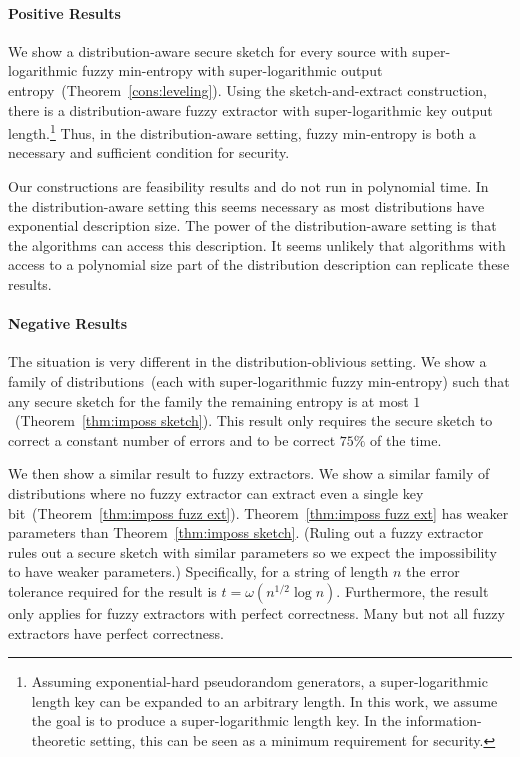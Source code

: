 \documentclass[11pt]{article}
\newcommand{\thref}[1]{\mbox{Theorem~\ref{#1}}}
\newcommand{\authnote}[2]{{\textcolor{red}{\textsf{#1 notes: }\textcolor{blue}{ #2}}\marginpar{\textcolor{red}{\textbf{!!!!!}}}}}
\newcommand{\authnote}[2]{}
\newcommand{\lnote}[1]{{\authnote{Leo}{#1}}}
\begin{document}
\paragraph{Positive Results} %
We show a distribution-aware secure sketch for every source with super-logarithmic fuzzy min-entropy with super-logarithmic output entropy~(\thref{cons:leveling}).  Using the sketch-and-extract construction, there is a distribution-aware fuzzy extractor with super-logarithmic key output length.\footnote{Assuming exponential-hard pseudorandom generators, a super-logarithmic length key can be expanded to an arbitrary length.  In this work, we assume the goal is to produce a super-logarithmic length key.  In the information-theoretic setting, this can be seen as a minimum requirement for security.}  Thus, in the distribution-aware setting, fuzzy min-entropy is both a necessary and sufficient condition for security.  

Our constructions are feasibility results and do not run in polynomial time.  In the distribution-aware setting this seems necessary as most distributions have exponential description size.  The power of the distribution-aware setting is that the algorithms can access this description.  It seems unlikely that algorithms with access to a polynomial size part of the distribution description can replicate these results.

\paragraph{Negative Results}
The situation is very different in the distribution-oblivious setting.  We show a family of distributions~(each with super-logarithmic fuzzy min-entropy) such that any secure sketch for the family the remaining entropy is at most $1$~(\thref{thm:imposs sketch}).  This result only requires the secure sketch to correct a constant number of errors and to be correct $75\%$ of the time.  

We then show a similar result to fuzzy extractors.  We show a similar family of distributions where no fuzzy extractor can extract even a single key bit~(\thref{thm:imposs fuzz ext}).  \thref{thm:imposs fuzz ext} has weaker parameters than \thref{thm:imposs sketch}.  (Ruling out a fuzzy extractor rules out a secure sketch with similar parameters so we expect the impossibility to have weaker parameters.)  Specifically, for a string of length $n$ the error tolerance required for the result is $t=\omega(n^{1/2}\log n)$.  Furthermore, the result only applies for fuzzy extractors with perfect correctness.  Many but not all fuzzy extractors have perfect correctness.
\end{document}
